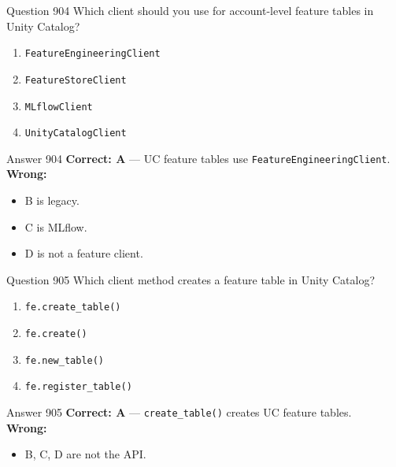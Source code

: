 \documentclass[aspectratio=169,11pt]{beamer}
\begin{document}
	\begin{frame}{Question 904}
		Which client should you use for account-level feature tables in Unity Catalog?
		\begin{enumerate}[label=\Alph*.]
			\item \texttt{FeatureEngineeringClient}
			\item \texttt{FeatureStoreClient}
			\item \texttt{MLflowClient}
			\item \texttt{UnityCatalogClient}
		\end{enumerate}
	\end{frame}
	\begin{frame}{Answer 904}
		\textbf{Correct: A} --- UC feature tables use \texttt{FeatureEngineeringClient}.\\
		\vspace{0.5em}
		\textbf{Wrong:}
		\begin{itemize}
			\item B is legacy.
			\item C is MLflow.
			\item D is not a feature client.
		\end{itemize}
	\end{frame}
	
	\begin{frame}{Question 905}
		Which client method creates a feature table in Unity Catalog?
		\begin{enumerate}[label=\Alph*.]
			\item \texttt{fe.create\_table()}
			\item \texttt{fe.create()}
			\item \texttt{fe.new\_table()}
			\item \texttt{fe.register\_table()}
		\end{enumerate}
	\end{frame}
	\begin{frame}{Answer 905}
		\textbf{Correct: A} --- \texttt{create\_table()} creates UC feature tables.\\
		\vspace{0.5em}
		\textbf{Wrong:}
		\begin{itemize}
			\item B, C, D are not the API.
		\end{itemize}
	\end{frame}
	
\end{document}
